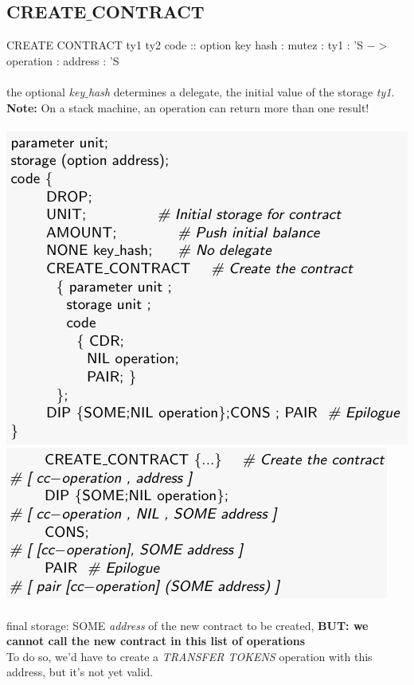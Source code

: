 \documentclass{article}
\begin{document}
\subsection{CREATE$\_$CONTRACT}
CREATE CONTRACT ty1 ty2 code :: option key hash : mutez : ty1 : 'S $->$ operation : address : 'S\\\\
the optional \textit{key$\_$hash} determines a delegate, the initial value of the storage \textit{ty1}.
\textbf{Note: }On a stack machine, an operation can return more than one result!\\\\
\includegraphics[scale=0.3]{79.png}
\includegraphics[scale=0.3]{80.png}\\\\
final storage: SOME \textit{address }of the new contract to be created, 
\textbf{BUT: we cannot call the new contract in this list of operations}\\
To do so, we’d have to create a \textit{TRANSFER TOKENS }operation with this address, but it’s not yet valid.\\\\
\end{document}
